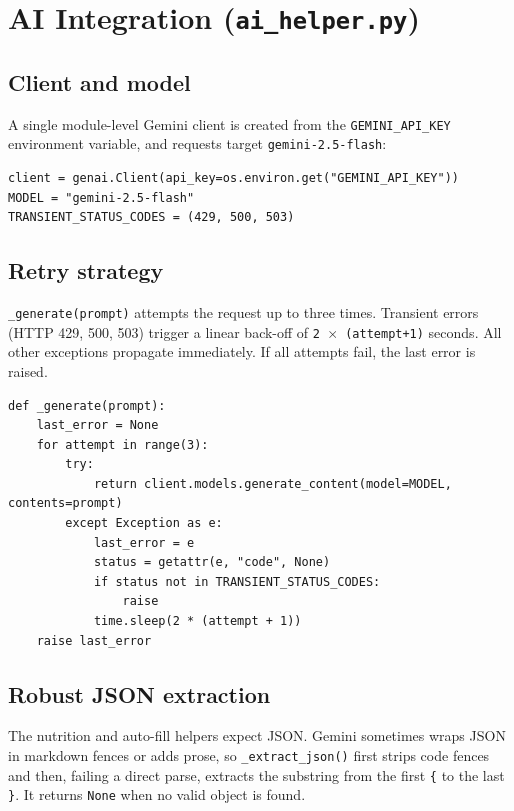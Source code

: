 \documentclass[11pt,a4paper]{article}
\newcommand{\code}[1]{\texttt{#1}}
\begin{document}
\section{AI Integration (\texttt{ai\_helper.py})}

\subsection{Client and model}
A single module-level Gemini client is created from the \code{GEMINI\_API\_KEY}
environment variable, and requests target \code{gemini-2.5-flash}:

\begin{lstlisting}[caption={AI client setup}]
client = genai.Client(api_key=os.environ.get("GEMINI_API_KEY"))
MODEL = "gemini-2.5-flash"
TRANSIENT_STATUS_CODES = (429, 500, 503)
\end{lstlisting}

\subsection{Retry strategy}
\code{\_generate(prompt)} attempts the request up to three times. Transient
errors (HTTP 429, 500, 503) trigger a linear back-off of
\code{2\,$\times$\,(attempt+1)} seconds. All other exceptions propagate
immediately. If all attempts fail, the last error is raised.

\begin{lstlisting}[caption={Retry wrapper}]
def _generate(prompt):
    last_error = None
    for attempt in range(3):
        try:
            return client.models.generate_content(model=MODEL, contents=prompt)
        except Exception as e:
            last_error = e
            status = getattr(e, "code", None)
            if status not in TRANSIENT_STATUS_CODES:
                raise
            time.sleep(2 * (attempt + 1))
    raise last_error
\end{lstlisting}

\subsection{Robust JSON extraction}
The nutrition and auto-fill helpers expect JSON. Gemini sometimes wraps JSON in
markdown fences or adds prose, so \code{\_extract\_json()} first strips code
fences and then, failing a direct parse, extracts the substring from the first
\code{\{} to the last \code{\}}. It returns \code{None} when no valid object is
found.
\end{document}
